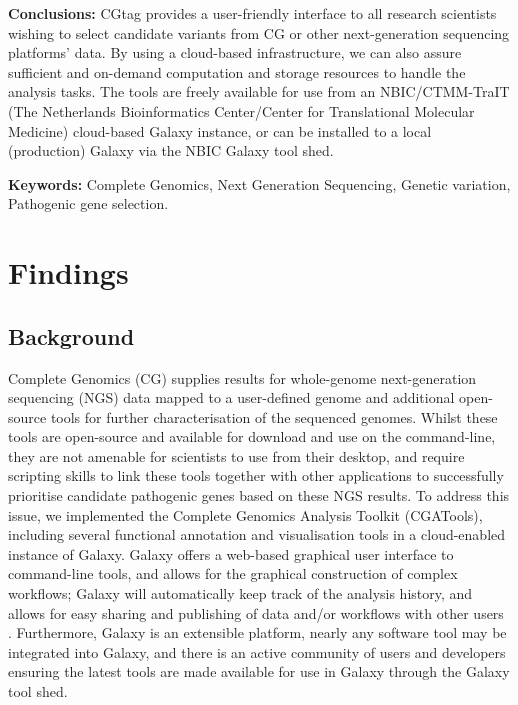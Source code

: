 \textbf{Conclusions:} CGtag provides a user-friendly interface to all research scientists wishing to select candidate variants from CG or other next-generation sequencing platforms’ data. By using a cloud-based infrastructure, we can also assure sufficient and on-demand computation and storage resources to handle the analysis tasks. The tools are freely available for use from an NBIC/CTMM-TraIT (The Netherlands Bioinformatics Center/Center for Translational Molecular Medicine) cloud-based Galaxy instance, or can be installed to a local (production) Galaxy via the NBIC Galaxy tool shed.

\textbf{Keywords:} Complete Genomics, Next Generation Sequencing, Genetic variation, Pathogenic gene selection.



\section*{Findings }

\subsection*{Background}

Complete Genomics (CG) supplies results for whole-genome next-generation sequencing (NGS) data mapped to a user-defined genome \cite{ma} and additional open-source tools \cite{url-cgatools} for further characterisation of the sequenced genomes. Whilst these tools are open-source and available for download and use on the command-line, they are not amenable for scientists to use from their desktop, and require scripting skills to link these tools together with other applications to successfully prioritise candidate pathogenic genes based on these NGS results. To address this issue, we implemented the Complete Genomics Analysis Toolkit (CGATools), including several functional annotation and visualisation tools in a cloud-enabled instance of Galaxy. Galaxy offers a web-based graphical user interface to command-line tools, and allows for the graphical construction of complex workflows; Galaxy will automatically keep track of the analysis history, and allows for easy sharing and publishing of data and/or workflows with other users \cite{goecks2010galaxy, blankenberg2010galaxy2, giardine2005galaxy}. Furthermore, Galaxy is an extensible platform, nearly any software tool may be integrated into Galaxy, and there is an active community of users and developers ensuring the latest tools are made available for use in Galaxy through the Galaxy tool shed.

